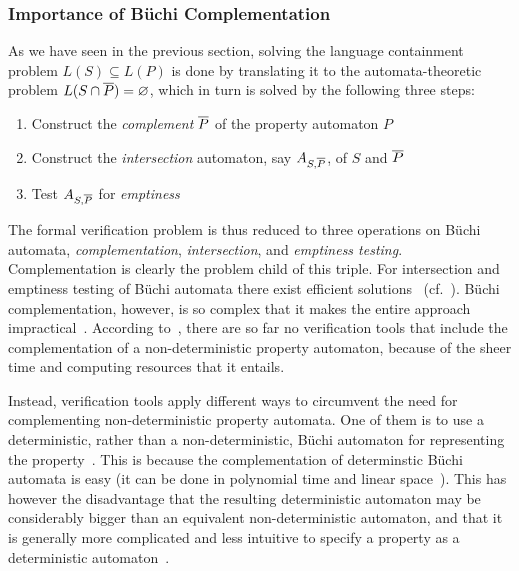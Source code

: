 \subsubsection{Importance of Büchi Complementation}

As we have seen in the previous section, solving the language containment problem $L(S) \subseteq L(P)$ is done by translating it to the automata-theoretic problem $L(S \cap \cl1{P}) = \varnothing$, which in turn is solved by the following three steps:

\begin{enumerate}
\item Construct the \textit{complement} $\cl1{P}$ of the property automaton $P$
\item Construct the \textit{intersection} automaton, say $A_{S,\cl1{P}}$, of $S$ and $\cl1{P}$
\item Test $A_{S,\cl1{P}}$ for \textit{emptiness}
\end{enumerate}

The formal verification problem is thus reduced to three operations on Büchi automata, \textit{complementation}, \textit{intersection}, and \textit{emptiness testing}. Complementation is clearly the problem child of this triple. For intersection and emptiness testing of Büchi automata there exist efficient solutions~\cite{2007_vardi_model_checking} (cf.~\cite{1996_vardi}). Büchi complementation, however, is so complex that it makes the entire approach impractical~\cite{1995_tasiran}. According to~\cite{2007_vardi_model_checking}, there are so far no verification tools that include the complementation of a non-deterministic property automaton, because of the sheer time and computing resources that it entails.

Instead, verification tools apply different ways to circumvent the need for complementing non-deterministic property automata. One of them is to use a deterministic, rather than a non-deterministic, Büchi automaton for representing the property~\cite{1995_tasiran}\cite{2007_vardi_model_checking}. This is because the complementation of determinstic Büchi automata is easy (it can be done in polynomial time and linear space~\cite{Kurshan198759}). This has however the disadvantage that the resulting deterministic automaton may be considerably bigger than an equivalent non-deterministic automaton, and that it is generally more complicated and less intuitive to specify a property as a deterministic automaton~\cite{1995_tasiran}.

